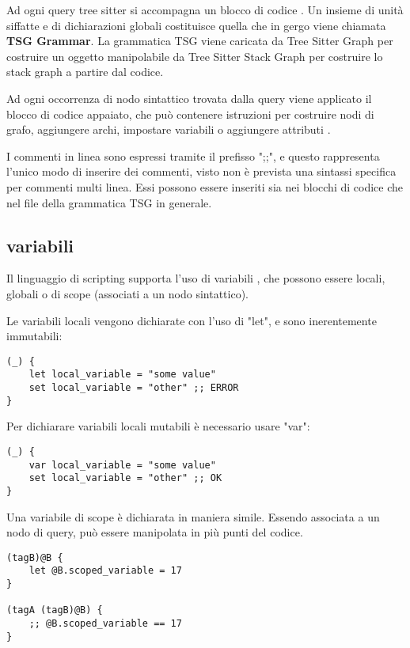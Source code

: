 Ad ogni query tree sitter si accompagna un blocco di codice \cite{TreeSitterGraphReferenceHighLevelStructure}.
Un insieme di unit\`a siffatte e di dichiarazioni globali costituisce quella che in gergo viene chiamata \textbf{TSG Grammar}.
La grammatica TSG viene caricata da Tree Sitter Graph per costruire un oggetto manipolabile da Tree Sitter Stack Graph per costruire lo stack graph a partire dal codice.

Ad ogni occorrenza di nodo sintattico trovata dalla query viene applicato il blocco di codice appaiato, che pu\`o contenere istruzioni per costruire nodi di grafo, aggiungere archi, impostare variabili o aggiungere attributi \cite{TreeSitterGraphReferenceTerminology}.

I commenti in linea sono espressi tramite il prefisso ";;", e questo rappresenta l'unico modo di inserire dei commenti, visto non \`e prevista una sintassi specifica per commenti multi linea.
Essi possono essere inseriti sia nei blocchi di codice che nel file della grammatica TSG in generale.

\subsection{variabili}
Il linguaggio di scripting supporta l'uso di variabili \cite{TreeSitterGraphReferenceVariables}, che possono essere locali, globali o di scope (associati a un nodo sintattico).

Le variabili locali vengono dichiarate con l'uso di "let", e sono inerentemente immutabili:

\begin{lstlisting}
(_) {
    let local_variable = "some value"
    set local_variable = "other" ;; ERROR
}
\end{lstlisting}

Per dichiarare variabili locali mutabili \`e necessario usare "var":

\begin{lstlisting}
(_) {
    var local_variable = "some value"
    set local_variable = "other" ;; OK
}
\end{lstlisting}

Una variabile di scope \`e dichiarata in maniera simile. Essendo associata a un nodo di query, pu\`o essere manipolata in pi\`u punti del codice.

\begin{lstlisting}
(tagB)@B {
    let @B.scoped_variable = 17
}

(tagA (tagB)@B) {
    ;; @B.scoped_variable == 17
}
\end{lstlisting}

